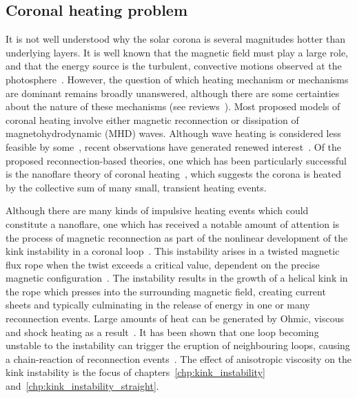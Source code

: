 \subsection{Coronal heating problem}

It is not well understood why the solar corona is several magnitudes hotter than underlying layers. It is well known that the magnetic field must play a large role, and that the energy source is the turbulent, convective motions observed at the photosphere~\cite{browningMechanismsSolarCoronal1991}. However, the question of which heating mechanism or mechanisms are dominant remains broadly unanswered, although there are some certainties about the nature of these mechanisms (see reviews~\cite{demoortelRecentAdvancesCoronal2015,realeCoronalLoopsObservations2014}). Most proposed models of coronal heating involve either magnetic reconnection or dissipation of magnetohydrodynamic (MHD) waves. Although wave heating is considered less feasible by some~\cite{klimchukSolvingCoronalHeating2006a}, recent observations have generated renewed interest~\cite{hahnEvidenceWaveHeating2013,demoortelRecentAdvancesCoronal2015,mcintoshAlfvenicWavesSufficient2011,jessAlfvenWavesLower2009,depontieuChromosphericAlfvenicWaves2007}. Of the proposed reconnection-based theories, one which has been particularly successful is the nanoflare theory of coronal heating~\cite{klimchukSolvingCoronalHeating2006a}, which suggests the corona is heated by the collective sum of many small, transient heating events. 

Although there are many kinds of impulsive heating events which could constitute a nanoflare, one which has received a notable amount of attention is the process of magnetic reconnection as part of the nonlinear development of the kink instability in a coronal loop~\cite{hoodKinkInstabilitySolar1979,browningSolarCoronalHeating2003c,hoodCoronalHeatingMagnetic2009,browningHeatingCoronaNanoflares2008a}. This instability arises in a twisted magnetic flux rope when the twist exceeds a critical value, dependent on the precise magnetic configuration~\cite{hoodCoronalHeatingMagnetic2009}. The instability results in the growth of a helical kink in the rope which presses into the surrounding magnetic field, creating current sheets and typically culminating in the release of energy in one or many reconnection events. Large amounts of heat can be generated by Ohmic, viscous and shock heating as a result~\cite{barefordShockHeatingNumerical2015,hoodCoronalHeatingMagnetic2009}. It has been shown that one loop becoming unstable to the instability can trigger the eruption of neighbouring loops, causing a chain-reaction of reconnection events~\cite{hoodMHDAvalancheModel2015}. The effect of anisotropic viscosity on the kink instability is the focus of chapters~\ref{chp:kink_instability} and~\ref{chp:kink_instability_straight}.


